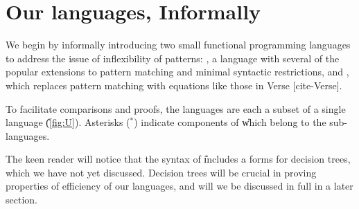 \documentclass[manuscript,screen,review, 12pt]{acmart}
\begin{document}


\section{Our languages, Informally}

We begin by informally introducing two small functional programming languages to
address the issue of inflexibility of patterns: \PPlus, a language with several
of the popular extensions to pattern matching and minimal syntactic
restrictions, and \VMinus, which replaces pattern matching with equations like
those in Verse [cite-Verse]. 

To facilitate comparisons and proofs, the languages are each a subset of a 
single language \U (\cref{fig:U}). Asterisks (${}^{*}$) indicate components of \U which 
belong to the sub-languages. 

The keen reader will notice that the syntax of \U includes a forms for
decision trees, which we have not yet discussed. Decision trees will be crucial
in proving properties of efficiency of our languages, and will we be discussed
in full in a later section. 
\end{document}
